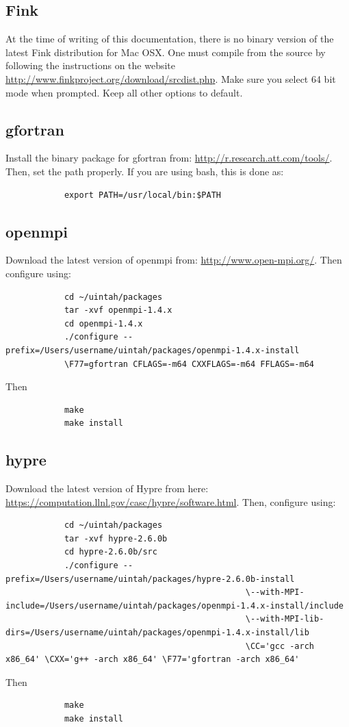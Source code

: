 \documentclass[12pt]{article}
\begin{document}
	\subsection{Fink}
		At the time of writing of this documentation, there is no binary version of the latest Fink distribution for Mac OSX. One must compile from the source by following the instructions on the website \url{http://www.finkproject.org/download/srcdist.php}. Make sure you select 64 bit mode when prompted. Keep all other options to default.
	
	\subsection{gfortran}
		Install the binary package for gfortran from: \url{http://r.research.att.com/tools/}. Then, set the path properly. If you are using bash, this is done as:
		\begin{verbatim}
			export PATH=/usr/local/bin:$PATH
		\end{verbatim}
	
	\subsection{openmpi}
		Download the latest version of openmpi from: \url{http://www.open-mpi.org/}. Then configure using:
		\begin{verbatim}
			cd ~/uintah/packages
			tar -xvf openmpi-1.4.x
			cd openmpi-1.4.x
			./configure --prefix=/Users/username/uintah/packages/openmpi-1.4.x-install 
			\F77=gfortran CFLAGS=-m64 CXXFLAGS=-m64 FFLAGS=-m64
		\end{verbatim}
		Then
		\begin{verbatim}
			make
			make install
		\end{verbatim}
		
		\subsection{hypre}
		Download the latest version of Hypre from here: \url{https://computation.llnl.gov/casc/hypre/software.html}. Then, configure using:
		\begin{verbatim}
			cd ~/uintah/packages
			tar -xvf hypre-2.6.0b
			cd hypre-2.6.0b/src
			./configure --prefix=/Users/username/uintah/packages/hypre-2.6.0b-install 
												 \--with-MPI-include=/Users/username/uintah/packages/openmpi-1.4.x-install/include 
												 \--with-MPI-lib-dirs=/Users/username/uintah/packages/openmpi-1.4.x-install/lib 
												 \CC='gcc -arch x86_64' \CXX='g++ -arch x86_64' \F77='gfortran -arch x86_64' 
		\end{verbatim}
		Then
		\begin{verbatim}
			make
			make install
		\end{verbatim}
		
\end{document}

